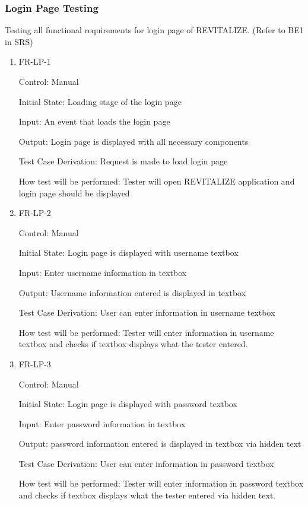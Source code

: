 \documentclass[12pt, titlepage]{article}
\begin{document}
\subsubsection{Login Page Testing}

Testing all functional requirements for login page of REVITALIZE. (Refer to BE1 in SRS)

\begin{enumerate}
	
	\item{FR-LP-1\\}
	
	Control: Manual
	
	Initial State: Loading stage of the login page
	
	Input: An event that loads the login page
	
	Output: Login page is displayed with all necessary components
	
	Test Case Derivation: Request is made to load login page
	
	How test will be performed: Tester will open REVITALIZE application and login page should be displayed
	
	\item{FR-LP-2\\}
	
	Control: Manual
	
	Initial State: Login page is displayed with username textbox
	
	Input: Enter username information in textbox
	
	Output: Username information entered is displayed in textbox
	
	Test Case Derivation: User can enter information in username textbox
	
	How test will be performed: Tester will enter information in username textbox and checks if textbox displays what the tester entered.
	
	\item{FR-LP-3\\}
	
	Control: Manual
	
	Initial State: Login page is displayed with password textbox
	
	Input: Enter password information in textbox
	
	Output: password information entered is displayed in textbox via hidden text
	
	Test Case Derivation: User can enter information in password textbox
	
	How test will be performed: Tester will enter information in password textbox and checks if textbox displays what the tester entered via hidden text.
	

\end{enumerate}
\end{document}
